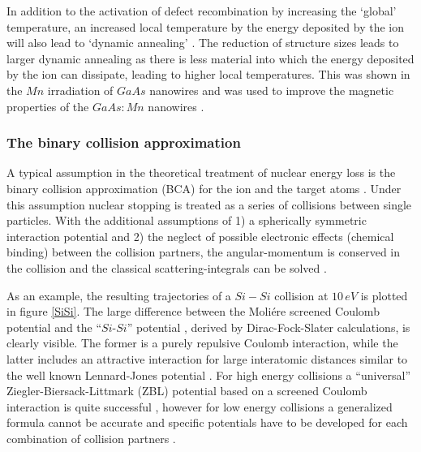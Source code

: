 In addition to the activation of defect recombination by increasing the `global' temperature, an increased local temperature by the energy deposited by the ion will also lead to `dynamic annealing' \cite{dhara_formation_2007}. The reduction of structure sizes leads to larger dynamic annealing as there is less material into which the energy deposited by the ion can dissipate, leading to higher local temperatures. This was shown in the $Mn$ irradiation of $GaAs$ nanowires \cite{borschel_ion-solid_2012,johannes_ion_2015} and was used to improve the magnetic properties of the $GaAs\! \! :\! \! Mn$ nanowires \cite{borschel_new_2011,paschoal_hopping_2012,kumar_magnetic_2013,paschoal_magnetoresistance_2014}. 


\subsubsection{The binary collision approximation}

A typical assumption in the theoretical treatment of nuclear energy loss is the binary collision approximation (BCA) for the ion and the target atoms \cite{eckstein_computer_1991}. Under this assumption nuclear stopping is treated as a series of collisions between single particles. With the additional assumptions of 1) a spherically symmetric interaction potential and 2) the neglect of possible electronic effects (chemical binding) between the collision partners, the angular-momentum is conserved in the collision and the classical scattering-integrals can be solved \cite{ziegler_stopping_1985}. 

As an example, the resulting trajectories of a $Si-Si$ collision at $10\,eV$ is plotted in figure \ref{SiSi}. The large difference between the Moliére screened Coulomb potential \cite{moliere_theorie_1947} and the ``$Si$-$Si$'' potential \cite{hackel_inter-nuclear_1990}, derived by Dirac-Fock-Slater calculations, is clearly visible. The former is a purely repulsive Coulomb interaction, while the latter includes an attractive interaction for large interatomic distances similar to the well known Lennard-Jones potential \cite{jones_determination_1924,eckstein_computer_1991}. For high energy collisions a ``universal'' Ziegler-Biersack-Littmark (ZBL) potential based on a screened Coulomb interaction is quite successful \cite{ziegler_stopping_1985}, however for low energy collisions a generalized formula cannot be accurate and specific potentials have to be developed for each combination of collision partners \cite{dedkov_interatomic_1995,nordlund_repulsive_1997,albe_modeling_2002,nordlund_interatomic_2008}.


